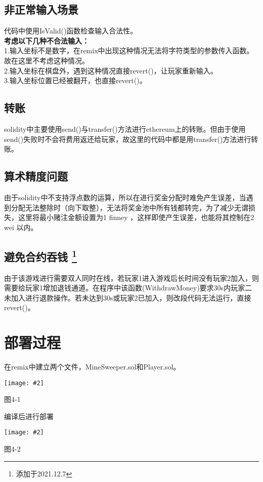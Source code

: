 \documentclass[UTF8]{ctexart}
\newcommand\picturehere[2][1]{\centerline{\texttt{[image: \#2]}}}
\begin{document}
	\subsection{非正常输入场景}
	\indent 代码中使用IsValid()函数检查输入合法性。\\
	\indent \heiti \textbf{考虑以下几种不合法输入：} \\
	\songti
	\indent \indent 1.输入坐标不是数字，在remix中出现这种情况无法将字符类型的参数传入函数。故在这里不考虑这种情况。\\
	\indent \indent 2.输入坐标在棋盘外，遇到这种情况直接revert()，让玩家重新输入。\\
	\indent \indent 3.输入坐标位置已经被翻开，也直接revert()。
	\subsection{转账}
	\indent solidity中主要使用send()与transfer()方法进行ethereum上的转账。但由于使用send()失败时不会将费用返还给玩家，故这里的代码中都是用transfer()方法进行转账。
	\subsection{算术精度问题}
	\indent 由于solidity中不支持浮点数的运算，所以在进行奖金分配时难免产生误差，当遇到分配无法整除时（向下取整），无法将奖金池中所有钱都转完，为了减少无谓损失，这里将最小赌注金额设置为1 finney ，这样即使产生误差，也能将其控制在2 wei 以内。
	\subsection{避免合约吞钱 \protect\footnote[2]{添加于2021.12.7} }
	\indent 由于该游戏进行需要双人同时在线，若玩家1进入游戏后长时间没有玩家2加入，则需要给玩家1增加退钱通道。在程序中该函数(WithdrawMoney)要求30s内玩家二未加入进行退款操作。若未达到30s或玩家2已加入，则改段代码无法运行，直接revert()。

	\newpage
  \section{部署过程}
  在remix中建立两个文件，MineSweeper.sol和Player.sol。\\
	\picturehere[0.5]{s8.png}
	\begin{center} 图4-1 \end{center}
	\indent 编译后进行部署 \\
	\picturehere[0.6]{s9.png}
	\begin{center} 图4-2 \end{center} %
\end{document}
